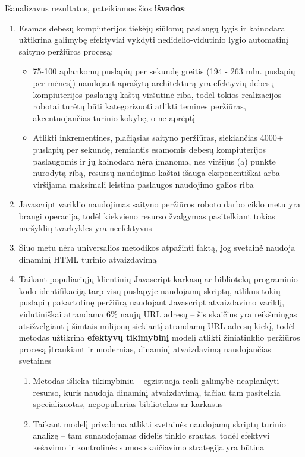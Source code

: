 
Išanalizavus rezultatus, pateikiamos šios \textbf{išvados}:

\begin{enumerate}
    \item Esamas debesų kompiuterijos tiekėjų siūlomų paslaugų lygis ir kainodara užtikrina galimybę efektyviai vykdyti nedidelio-vidutinio lygio automatinį saityno peržiūros procesą:
    \begin{itemize}
        \item 75-100 aplankomų puslapių per sekundę greitis (194 - 263 mln. puslapių per mėnesį) naudojant aprašytą architektūrą yra efektyvių debesų kompiuterijos paslaugų kaštų viršutinė riba, todėl tokios realizacijos robotai turėtų būti kategorizuoti atlikti temines peržiūras, akcentuojančias turinio kokybę, o ne aprėptį
        
        \item Atlikti inkrementines, plačiąsias saityno peržiūras, siekiančias 4000+ puslapių per sekundę, remiantis esamomis debesų kompiuterijos paslaugomis ir jų kainodara nėra įmanoma, nes viršijus (a) punkte nurodytą ribą, resursų naudojimo kaštai išauga eksponentiškai arba viršijama maksimali leistina paslaugos naudojimo galios riba 
    \end{itemize}
    
    \item Javascript variklio naudojimas saityno peržiūros roboto darbo ciklo metu yra brangi operacija, todėl kiekvieno resurso žvalgymas pasitelkiant tokias naršyklių tvarkykles yra neefektyvus 
    
    \item Šiuo metu nėra universalios metodikos atpažinti faktą, jog svetainė naudoja dinaminį HTML turinio atvaizdavimą
    
    \item Taikant populiariųjų klientinių Javascript karkasų ar bibliotekų programinio kodo identifikaciją tarp visų puslapyje naudojamų skriptų, atlikus tokių puslapių pakartotinę peržiūrą naudojant Javascript atvaizdavimo variklį, vidutiniškai atrandama 6\% naujų URL adresų -- šis skaičius yra reikšmingas atsižvelgiant į šimtais milijonų siekiantį atrandamų URL adresų kiekį, todėl metodas užtikrina \textbf{efektyvų tikimybinį} modelį atlikti žiniatinklio peržiūros procesą įtraukiant ir modernias, dinaminį atvaizdavimą naudojančias svetaines
    \begin{enumerate}
        \item Metodas išlieka tikimybiniu -- egzistuoja reali galimybė neaplankyti resurso, kuris naudoja dinaminį atvaizdavimą, tačiau tam pasitelkia specializuotas, nepopuliarias bibliotekas ar karkasus
        \item Taikant modelį privaloma atlikti svetainės naudojamų skriptų turinio analizę -- tam sunaudojamas didelis tinklo srautas, todėl efektyvi kešavimo ir kontrolinės sumos skaičiavimo strategija yra būtina
    \end{enumerate}
\end{enumerate}